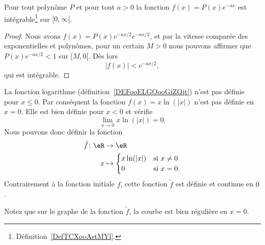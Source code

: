 \begin{proposition} \label{PropBQGBooHxNrrf}
    Pour tout polynôme \( P\) et pour tout \( a>0\) la fonction \( f(x)=P(x) e^{-ax}\) est intégrable\footnote{Définition~\ref{DefTCXooAstMYl}.} sur \( \mathopen[ 0 , \infty [\).
\end{proposition}

\begin{proof}
    Nous avons \( f(x)=P(x) e^{-ax/2} e^{-ax/2}\), et par la vitesse comparée des exponentielles et polynômes, pour un certain \( M>0\) nous pouvons affirmer que \( P(x) e^{-ax/2}<1\) sur \( \mathopen[ M , 0 [\). Dès lors
        \begin{equation}
            | f(x) |< e^{-ax/2},
        \end{equation}
        qui est intégrable.
\end{proof}

\begin{example}     \label{EXooAGEOooQdQkrS}
    La fonction logarithme (définition~\ref{DEFooELGOooGiZQjt}) n'est pas définie pour \( x\leq 0\). Par conséquent la fonction \( f(x)=x\ln(|x|)\) n'est pas définie en \( x=0\). Elle est bien définie pour \( x<0\) et vérifie
    \begin{equation}
        \lim_{x\to 0} x\ln(|x|)=0.
    \end{equation}
    Nous pouvons donc définir la fonction
    \begin{equation}
        \begin{aligned}
            \tilde f\colon \eR&\to \eR \\
            x&\mapsto \begin{cases}
                x\ln(| x |)    &   \text{si } x\neq 0\\
                0    &    \text{si } x=0.
            \end{cases}
        \end{aligned}
    \end{equation}
    Contrairement à la fonction initiale \( f\), cette fonction \( \tilde f\) est définie et continue en \( 0\).

    Notez que sur le graphe de la fonction \( \tilde f\), la courbe est bien régulière en \( x=0\).
    \begin{center}
       
    \end{center}
\end{example}

